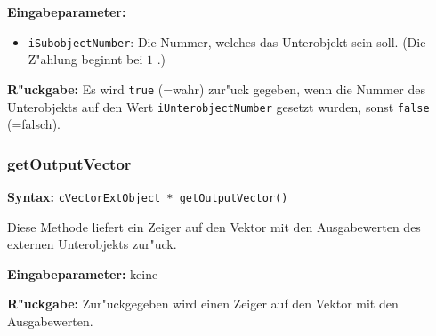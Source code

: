 \bigskip\noindent
\textbf{Eingabeparameter:}
\begin{itemize}
 \item \verb|iSubobjectNumber|: Die Nummer, welches das Unterobjekt sein soll. (Die Z"ahlung beginnt bei $1$ .)
\end{itemize}

\bigskip\noindent
\textbf{R"uckgabe:} Es wird \verb|true| (=wahr) zur"uck gegeben, wenn die Nummer des Unterobjekts auf den Wert \verb|iUnterobjectNumber| gesetzt wurden, sonst \verb|false| (=falsch).


\subsubsection{getOutputVector}

\textbf{Syntax:} \verb|cVectorExtObject * getOutputVector()|

\bigskip\noindent
Diese Methode liefert ein Zeiger auf den Vektor mit den Ausgabewerten des externen Unterobjekts zur"uck.

\bigskip\noindent
\textbf{Eingabeparameter:} keine

\bigskip\noindent
\textbf{R"uckgabe:} Zur"uckgegeben wird einen Zeiger auf den Vektor mit den Ausgabewerten.



